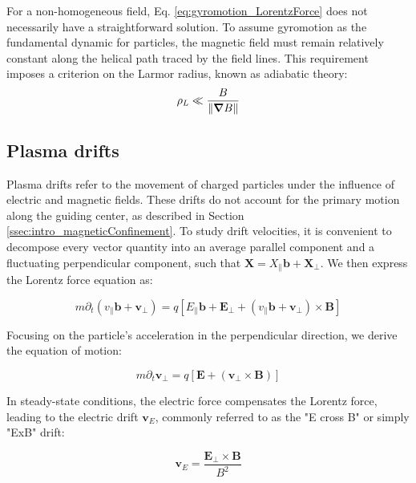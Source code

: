 For a non-homogeneous field, Eq. \ref{eq:gyromotion_LorentzForce} does not necessarily have a straightforward solution. To assume gyromotion as the fundamental dynamic for particles, the magnetic field must remain relatively constant along the helical path traced by the field lines. This requirement imposes a criterion on the Larmor radius, known as adiabatic theory:
\begin{equation}
	\label{eq:intro_adiabaticCondition}
	\rho_L \ll \frac{B}{\norm{\grad B}}
\end{equation}


\subsection{Plasma drifts}
\label{ssec:intro_plasmaDrifts}

Plasma drifts refer to the movement of charged particles under the influence of electric and magnetic fields. These drifts do not account for the primary motion along the guiding center, as described in Section \ref{ssec:intro_magneticConfinement}. To study drift velocities, it is convenient to decompose every vector quantity into an average parallel component and a fluctuating perpendicular component, such that $\mathbf{X} = X_\parallel\mathbf{b} + \mathbf{X_\perp}$. We then express the Lorentz force equation as:

\begin{equation}
	\label{eq:edge_LorentzEquationDecomposition}
	m\partial_t\left(v_\parallel\mathbf{b} + \mathbf{v}_\perp\right) = q\left[E_\parallel\mathbf{b} + \mathbf{E}_\perp + \left(v_\parallel\mathbf{b} + \mathbf{v}_\perp\right) \times \mathbf{B}\right]
\end{equation}

Focusing on the particle's acceleration in the perpendicular direction, we derive the equation of motion:

\begin{equation}
	\label{eq:edge_EcrossBdrift}
	m\partial_t \mathbf{v}_\perp = q\left[\mathbf{E} + \left(\mathbf{v}_\perp \times \mathbf{B}\right)\right]
\end{equation}

In steady-state conditions, the electric force compensates the Lorentz force, leading to the electric drift $\mathbf{v}_E$, commonly referred to as the "E cross B" or simply "ExB" drift:

\begin{equation}
	\mathbf{v}_E = \frac{\mathbf{E}_\perp \times \mathbf{B}}{B^2}
\end{equation}

